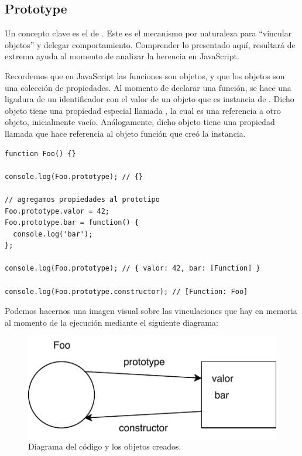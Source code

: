 
\subsection{Prototype}
\label{sec:prototype}

Un concepto clave es el de . Este es el mecanismo por naturaleza para "`vincular objetos"' y delegar comportamiento. Comprender lo presentado aquí, resultará de extrema ayuda al momento de analizar la herencia en JavaScript. 

Recordemos que en JavaScript las funciones son objetos, y que los objetos son una colección de propiedades. Al momento de declarar una función, se hace una ligadura de un identificador con el valor de un objeto que es instancia de . Dicho objeto tiene una propiedad especial llamada , la cual es una referencia a otro objeto, inicialmente vacío. Análogamente, dicho objeto tiene una propiedad llamada  que hace referencia al objeto función que creó la instancia.

\begin{lstlisting}[title={Analizando el \code{prototype} de una función}]
function Foo() {}

console.log(Foo.prototype); // {}

// agregamos propiedades al prototipo
Foo.prototype.valor = 42;
Foo.prototype.bar = function() {
  console.log('bar');
};

console.log(Foo.prototype); // { valor: 42, bar: [Function] }

console.log(Foo.prototype.constructor); // [Function: Foo]

\end{lstlisting}

Podemos hacernos una imagen visual sobre las vinculaciones que hay en memoria al momento de la ejecución mediante el siguiente diagrama:

\begin{figure}[!htbp]
\centering
\includegraphics{Figures/Prototype}
\decoRule
\caption[]{Diagrama del código y los objetos creados.}
\label{fig:prototype}
\end{figure}

